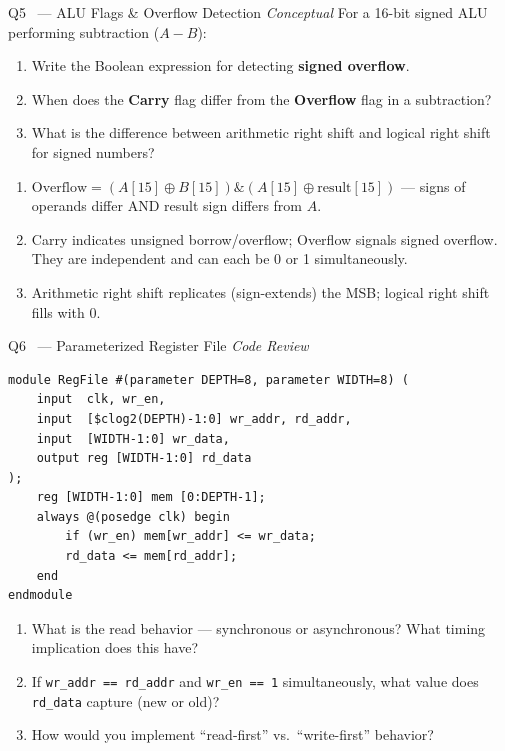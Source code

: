 \documentclass[12pt,a4paper]{article}
\newcommand{\advanced}{%
  \fbox{\textcolor{advred}{\bfseries\sffamily\small ADVANCED}}}
\begin{document}
\begin{questionbox}{Q5 \advanced\ --- ALU Flags \& Overflow Detection \hfill\textit{Conceptual}}
For a 16-bit signed ALU performing subtraction ($A - B$):
\begin{enumerate}[label=\textbf{\alph*)}]
  \item Write the Boolean expression for detecting \textbf{signed overflow}.
  \item When does the \textbf{Carry} flag differ from the \textbf{Overflow} flag in a subtraction?
  \item What is the difference between arithmetic right shift and logical right shift for signed numbers?
\end{enumerate}
\end{questionbox}

\begin{answerbox}
\begin{enumerate}[label=\textbf{\alph*)}]
  \item $\text{Overflow} = (A[15] \oplus B[15]) \mathbin{\&} (A[15] \oplus \text{result}[15])$ --- signs of operands differ AND result sign differs from $A$.
  \item Carry indicates unsigned borrow/overflow; Overflow signals signed overflow. They are independent and can each be 0 or 1 simultaneously.
  \item Arithmetic right shift replicates (sign-extends) the MSB; logical right shift fills with 0.
\end{enumerate}
\end{answerbox}

\begin{questionbox}{Q6 \advanced\ --- Parameterized Register File \hfill\textit{Code Review}}

\begin{lstlisting}[style=verilogstyle]
module RegFile #(parameter DEPTH=8, parameter WIDTH=8) (
    input  clk, wr_en,
    input  [$clog2(DEPTH)-1:0] wr_addr, rd_addr,
    input  [WIDTH-1:0] wr_data,
    output reg [WIDTH-1:0] rd_data
);
    reg [WIDTH-1:0] mem [0:DEPTH-1];
    always @(posedge clk) begin
        if (wr_en) mem[wr_addr] <= wr_data;
        rd_data <= mem[rd_addr];
    end
endmodule
\end{lstlisting}

\begin{enumerate}[label=\textbf{\alph*)}]
  \item What is the read behavior --- synchronous or asynchronous? What timing implication does this have?
  \item If \texttt{wr\_addr == rd\_addr} and \texttt{wr\_en == 1} simultaneously, what value does \texttt{rd\_data} capture (new or old)?
  \item How would you implement ``read-first'' vs.\ ``write-first'' behavior?
\end{enumerate}
\end{questionbox}
\end{document}
